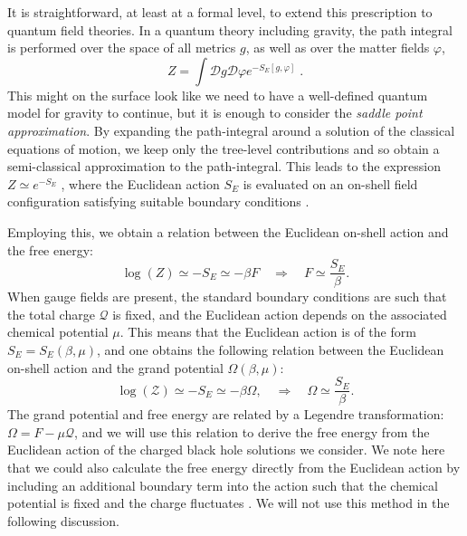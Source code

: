 It is straightforward, at least at a formal level, to extend this prescription to quantum field theories.
In a quantum theory including gravity, the path integral is performed 
over the space of all metrics $g$, as well as over the matter fields $\varphi$,
\begin{equation*}
    Z = \int \mathcal{D} g \mathcal{D} \varphi e^{-S_E[g, \varphi]} \;.
\end{equation*}
This might on the surface look like we need to have a well-defined quantum model for gravity to continue, but it is enough to consider the \emph{saddle point approximation}. By expanding the path-integral around a solution of the classical equations of motion, we keep only the tree-level contributions and so obtain a semi-classical approximation to the path-integral. This leads to the expression 
$Z \simeq e^{- S_E}$ , where the Euclidean action $S_E$ is evaluated on an
on-shell field configuration satisfying suitable boundary conditions \cite{Hawking:1995ap}. 

Employing this, we obtain a relation between the Euclidean on-shell action and the
free energy:
\begin{equation*}
    \log (Z) \simeq  - S_E \simeq - \beta F \quad  \Rightarrow \quad F \simeq \frac{S_E}{\beta}.
\end{equation*}
When gauge fields are present, the standard boundary conditions are such that 
the total charge $\mathcal{Q}$ is fixed, and the Euclidean action depends 
on the associated chemical potential $\mu$. This means that the Euclidean action is of the form $S_E  = S_E(\beta, \mu)$, and one obtains the following relation between the Euclidean on-shell action and the grand potential $\Omega(\beta, \mu)$:
\begin{equation*}
    \log (\mathcal{Z}) \simeq  - S_E \simeq - \beta \Omega, \quad \Rightarrow \quad \Omega \simeq \frac{S_E}{\beta}.
\end{equation*}
The grand potential and free energy are related by a Legendre transformation: $\Omega = F - \mu \mathcal{Q}$, and we will use this relation to derive the free energy from the Euclidean action of the charged black hole solutions we consider. We note here that we could also calculate the free energy directly from the Euclidean action by including an additional boundary term into the action such that the chemical potential is fixed and the charge fluctuates \cite{Hawking:1995ap}. We will not use this method in the following discussion.

